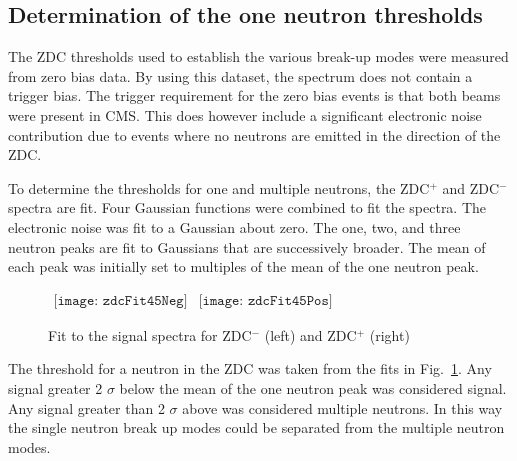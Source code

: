     \subsection{Determination of the one neutron thresholds}
      The ZDC thresholds used to establish the various break-up modes were 
        measured from zero bias data.
      By using this dataset, the spectrum does not contain a trigger bias. 
      The trigger requirement for the zero bias events is that both beams were 
        present in CMS.
      This does however include a significant electronic noise contribution due
        to events where no neutrons are emitted in the direction of the ZDC.

      To determine the thresholds for one and multiple neutrons, the ZDC$^{+}$ 
        and ZDC$^{-}$ spectra are fit.
      Four Gaussian functions were combined to fit the spectra. 
      The electronic noise was fit to a Gaussian about zero.
      The one, two, and three neutron peaks are fit to Gaussians that are 
        successively broader.
      The mean of each peak was initially set to multiples of the mean of the 
        one neutron peak. 
      \begin{figure}[!Hh]
        \centering
        $ \begin{array}{cc}
          \texttt{[image: zdcFit45Neg]} &
          \texttt{[image: zdcFit45Pos]}
        \end{array} $
        \caption{Fit to the signal spectra for ZDC$^{-}$ (left) and ZDC$^{+}$ 
          (right)}
        \label{fig:zdcM2Fit}
      \end{figure}
      The threshold for a neutron in the ZDC was taken from the fits in 
        Fig.~\ref{fig:zdcM2Fit}.
      Any signal greater 2 $\sigma$ below the mean of the one neutron peak was 
        considered signal.
      Any signal greater than 2 $\sigma$ above was considered multiple 
        neutrons.
      In this way the single neutron break up modes could be separated from the
        multiple neutron modes.

